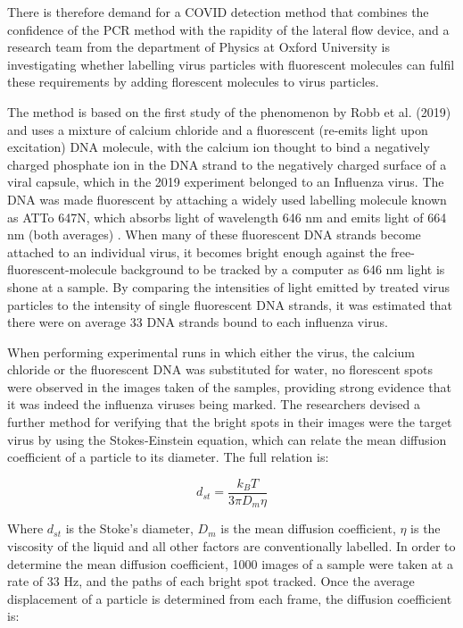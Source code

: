 \documentclass[11pt]{report}
\begin{document}
There is therefore demand for a COVID detection method that combines the confidence of the PCR method with the rapidity of the lateral flow device, and a research team from the department of Physics at Oxford University \cite{testing4} is investigating whether labelling virus particles with fluorescent molecules can fulfil these requirements by adding florescent molecules to virus particles.

The method is based on the first study of the phenomenon by Robb et al. (2019) \cite{testing5} and uses a mixture of calcium chloride and a fluorescent (re-emits light upon excitation) DNA molecule, with the calcium ion thought to bind a negatively charged phosphate ion in the DNA strand to the negatively charged surface of a viral capsule, which in the 2019 experiment belonged to an Influenza virus. The DNA was made fluorescent by attaching a widely used labelling molecule known as ATTo 647N, which absorbs light of wavelength 646 nm and emits light of 664 nm (both averages) \cite{testing6}. When many of these fluorescent DNA strands become attached to an individual virus, it becomes bright enough against the free-fluorescent-molecule background to be tracked by a computer as 646 nm light is shone at a sample. By comparing the intensities of light emitted by treated virus particles to the intensity of single fluorescent DNA strands, it was estimated that there were on average 33 DNA strands bound to each influenza virus.

When performing experimental runs in which either the virus, the calcium chloride or the fluorescent DNA was substituted for water, no florescent spots were observed in the images taken of the samples, providing strong evidence that it was indeed the influenza viruses being marked. The researchers devised a further method for verifying that the bright spots in their images were the target virus by using the Stokes-Einstein equation, which can relate the mean diffusion coefficient of a particle to its diameter. The full relation is:

\begin{equation}
    d_{st}=\frac{k_{B}T}{3\pi{}D_{m}\eta}
\end{equation}

Where $d_{st}$ is the Stoke’s diameter, $D_{m}$ is the mean diffusion coefficient, $\eta$ is the viscosity of the liquid and all other factors are conventionally labelled. In order to determine the mean diffusion coefficient, 1000 images of a sample were taken at a rate of 33 Hz, and the paths of each bright spot tracked. Once the average displacement of a particle is determined from each frame, the diffusion coefficient is:
\end{document}
